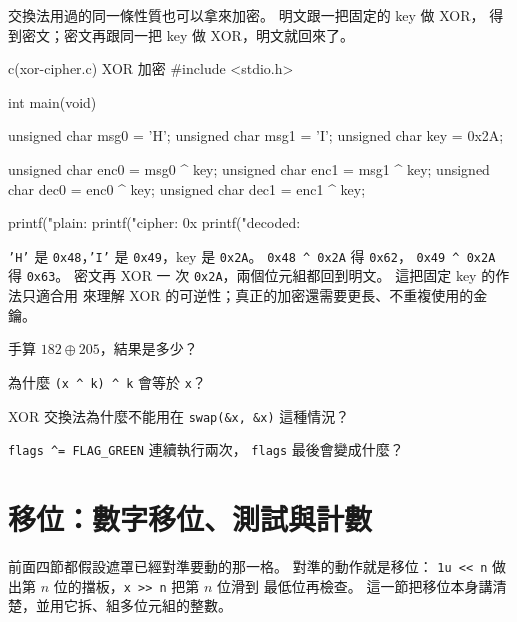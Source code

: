 交換法用過的同一條性質也可以拿來加密。 明文跟一把固定的 key 做 XOR，
得到密文；密文再跟同一把 key 做 XOR，明文就回來了。

\begin{example}{c}{(xor-cipher.c) XOR 加密}
#include <stdio.h>

int main(void) {
    unsigned char msg0 = 'H';
    unsigned char msg1 = 'I';
    unsigned char key = 0x2A;

    unsigned char enc0 = msg0 ^ key;
    unsigned char enc1 = msg1 ^ key;
    unsigned char dec0 = enc0 ^ key;
    unsigned char dec1 = enc1 ^ key;

    printf("plain: %
    printf("cipher: 0x%
    printf("decoded: %
}
\end{example}


\texttt{'H'} 是 \texttt{0x48}，\texttt{'I'} 是 \texttt{0x49}，key 是
\texttt{0x2A}。 \texttt{0x48 \textasciicircum{} 0x2A} 得 \texttt{0x62}，
\texttt{0x49 \textasciicircum{} 0x2A} 得 \texttt{0x63}。 密文再 XOR 一
次 \texttt{0x2A}，兩個位元組都回到明文。 這把固定 key 的作法只適合用
來理解 XOR 的可逆性；真正的加密還需要更長、不重複使用的金鑰。

\begin{drills}[label=drills:bit-xor]
\item 手算 $182 \oplus 205$，結果是多少？
\item 為什麼 \texttt{(x \textasciicircum{} k) \textasciicircum{} k}
會等於 \texttt{x}？
\item XOR 交換法為什麼不能用在 \texttt{swap(\&x, \&x)} 這種情況？
\item \texttt{flags \textasciicircum{}= FLAG\_GREEN} 連續執行兩次，
\texttt{flags} 最後會變成什麼？
\end{drills}

\section{移位：數字移位、測試與計數}
\label{sec:bit-shift}

前面四節都假設遮罩已經對準要動的那一格。 對準的動作就是移位：
\texttt{1u << n} 做出第 $n$ 位的擋板，\texttt{x >> n} 把第 $n$ 位滑到
最低位再檢查。 這一節把移位本身講清楚，並用它拆、組多位元組的整數。

